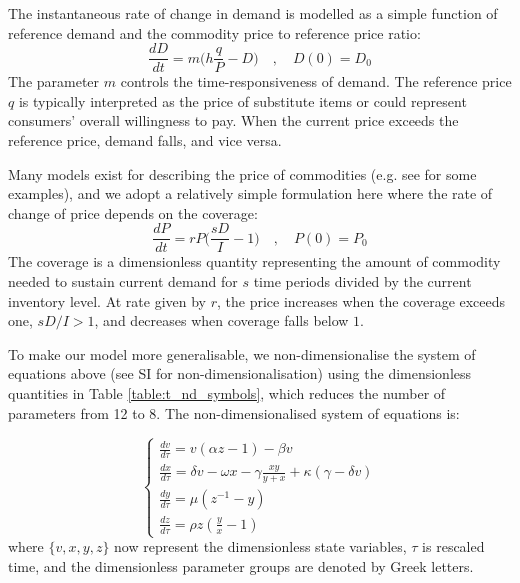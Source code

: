 \documentclass[9pt,twocolumn,twoside,lineno]{pnas-new}
\begin{document}
The instantaneous rate of change in demand is modelled as a simple function of reference demand and the commodity price to reference price ratio:
%
\begin{equation}
  \frac{dD}{dt} = m \Big( h \frac{q}{P} - D\Big) \quad, \quad D(0) = D_0
  \label{eq_demand}
\end{equation}
%
The parameter $m$ controls the time-responsiveness of demand. The reference price $q$ is typically interpreted as the price of substitute items \cite{sterman2000} or could represent consumers' overall willingness to pay. When the current price exceeds the reference price, demand falls, and vice versa.

Many models exist for describing the price of commodities (e.g. see \cite{legrand2019,deGoede2013} for some examples), and we adopt a relatively simple formulation here where the rate of change of price depends on the coverage:
%
\begin{equation}
  \frac{dP}{dt} = r P \Big(\frac{sD}{I} - 1\Big) \quad, \quad P(0) = P_0
  \label{eq_price}
\end{equation}
%
The coverage is a dimensionless quantity representing the amount of commodity needed to sustain current demand for $s$ time periods divided by the current inventory level. At rate given by $r$, the price increases when the coverage exceeds one, $sD/I > 1$, and decreases when coverage falls below $1$.

To make our model more generalisable, we non-dimensionalise the system of equations above (see SI for non-dimensionalisation) using the dimensionless quantities in Table \ref{table:t_nd_symbols}, which reduces the number of parameters from 12 to 8. The non-dimensionalised system of equations is:

\begin{equation}
    \begin{cases}
     \frac{dv}{d\tau} = v (\alpha z - 1) - \beta v \\
     \frac{dx}{d\tau} = \delta v - \omega x - \gamma \frac{xy}{y + x} + \kappa ( \gamma - \delta v)\\
     \frac{dy}{d\tau} = \mu ( z^{-1} - y)\\
     \frac{dz}{d\tau} = \rho z (\frac{y}{x} - 1)
    \end{cases}
    \label{eq:dimensionless}
\end{equation}
%
where $\{v, x, y, z\}$ now represent the dimensionless state variables, $\tau$ is rescaled time, and the dimensionless parameter groups are denoted by Greek letters.
\end{document}
